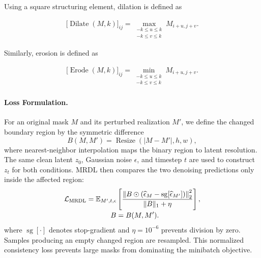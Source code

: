 \documentclass[journal]{IEEEtran}
\begin{document}
Using a square structuring element, dilation is defined as

\begin{equation}
\begin{aligned}
\bigl[
\operatorname{Dilate}(M,k)
\bigr]_{ij}
=
\max_{\substack{-k\leq u\leq k\\-k\leq v\leq k}}
M_{i+u,j+v}.
\end{aligned}
\label{eq:dilation}
\end{equation}

Similarly, erosion is defined as

\begin{equation}
\begin{aligned}
\bigl[
\operatorname{Erode}(M,k)
\bigr]_{ij}
=
\min_{\substack{-k\leq u\leq k\\-k\leq v\leq k}}
M_{i+u,j+v}.
\end{aligned}
\label{eq:erosion}
\end{equation}
\paragraph{Loss Formulation.}
For an original mask $M$ and its perturbed realization $M'$, we define the changed boundary region by the symmetric difference
\begin{equation}
B(M,M') = \operatorname{Resize}(|M-M'|,h,w),
\label{eq:boundary_band}
\end{equation}
where nearest-neighbor interpolation maps the binary region to latent resolution. The same clean latent $z_0$, Gaussian noise $\epsilon$, and timestep $t$ are used to construct $z_t$ for both conditions. MRDL then compares the two denoising predictions only inside the affected region:
\begin{equation}
\begin{aligned}
\mathcal{L}_{\mathrm{MRDL}}
&=
\mathbb{E}_{M',t,\epsilon}
\left[
\frac{
\left\|
B\odot
\left(
\widehat{\epsilon}_{M}
-
\operatorname{sg}[\widehat{\epsilon}_{M'}]
\right)
\right\|_2^2
}{
\|B\|_1+\eta
}
\right],\\[-2pt]
&\hspace{12mm} B=B(M,M').
\end{aligned}
\label{eq:mrd_loss}
\end{equation}
where $\operatorname{sg}[\cdot]$ denotes stop-gradient and $\eta=10^{-6}$ prevents division by zero. Samples producing an empty changed region are resampled. This normalized consistency loss prevents large masks from dominating the minibatch objective.
\end{document}
